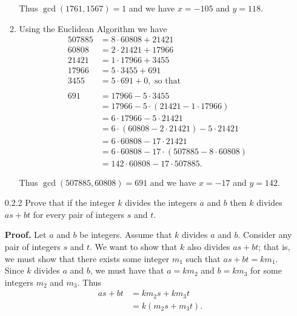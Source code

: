 \begin{enumerate}
\begin{enumerate}
               Thus $\gcd(1761, 1567) = 1$ and we have $x = -105$ and $y = 118$.
         \item Using the Euclidean Algorithm we have
               \begin{align*}
                  507885 &= 8 \cdot 60808 + 21421 \\
                  60808  &= 2 \cdot 21421 + 17966 \\
                  21421  &= 1 \cdot 17966 + 3455 \\
                  17966  &= 5 \cdot 3455 +  691 \\
                  3455   &= 5 \cdot 691 + 0, \text{ so that } \\ \\
                  691    &= 17966 - 5 \cdot 3455 \\
                         &= 17966 - 5 \cdot (21421 - 1 \cdot 17966) \\
                         &= 6 \cdot 17966 - 5 \cdot 21421 \\
                         &= 6 \cdot (60808 - 2 \cdot 21421) - 5 \cdot 21421 \\
                         &= 6 \cdot 60808 - 17 \cdot 21421 \\
                         &= 6 \cdot 60808 - 17 \cdot (507885 - 8 \cdot 60808) \\
                         &= 142 \cdot 60808 - 17 \cdot 507885.
               \end{align*}

               Thus $\gcd(507885, 60808) = 691$ and we have $x = -17$ and
               $y = 142$.
      \end{enumerate}
   \item[0.2.2]   Prove that if the integer $k$ divides the integers $a$ and $b$
                  then $k$ divides $as + bt$ for every pair of integers $s$ and
                  $t$.

      \textbf{Proof.} Let $a$ and $b$ be integers. Assume that $k$ divides
      $a$ and $b$. Consider any pair of integers $s$ and $t$. We want to show
      that $k$ also divides $as + bt$; that is, we must show that there exists
      some integer $m_1$ such that $as + bt = km_1$. Since $k$ divides $a$ and
      $b$, we must have that $a = km_2$ and $b = km_3$ for some integers $m_2$
      and $m_3$. Thus
      \begin{align*}
         as + bt &= km_2s + km_3t \\
                 &= k(m_2s + m_3t). 
      \end{align*}


\end{enumerate}
